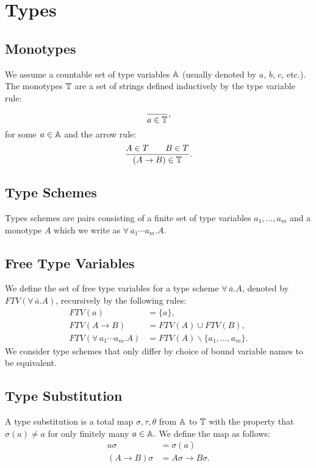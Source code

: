 \section{Types}

\subsection{Monotypes}

We assume a countable set of type variables $\mathbb{A}$ (usually
denoted by $a$, $b$, $c$, etc.). The monotypes $\mathbb{T}$ are a
set of strings defined inductively by the type variable rule:
\begin{align*}
    \frac{}{a \in \mathbb{T}},
\end{align*} for some $a \in \mathbb{A}$ and the arrow rule: \begin{align*}
    \frac{A \in T \qquad B \in T}{(A \to B) \in \mathbb{T}}.
\end{align*}

\subsection{Type Schemes}

Types schemes are pairs consisting of a finite set of type
variables $a_1, \ldots, a_m$ and a monotype $A$ which we
write as $\forall \, a_1 \cdots a_m.A$.

\subsection{Free Type Variables}

We define the set of free type variables for a type scheme
$\forall \, \bar{a}.A$, denoted by
\linebreak $FTV(\forall \, \bar{a}.A)$,
recursively by the following rules: \begin{align*}
    FTV(a) &= \{a\}, \\
    FTV(A \to B) &= FTV(A) \cup FTV(B), \\
    FTV(\forall \, a_1 \cdots a_m.A) &= FTV(A) \backslash \{a_1, \ldots, a_m\}.
\end{align*} We consider type schemes that only differ by choice
of bound variable names to be equivalent.

\subsection{Type Substitution}

A type substitution is a total map $\sigma, \tau, \theta$ 
from $\mathbb{A}$ to 
$\mathbb{T}$ with the property that $\sigma(a) \neq a$ for only
finitely many $a \in \mathbb{A}$. We define the map as follows:
\begin{align*}
    a\sigma &= \sigma(a) \\
    (A \to B)\sigma &= A\sigma \to B\sigma.
\end{align*}

